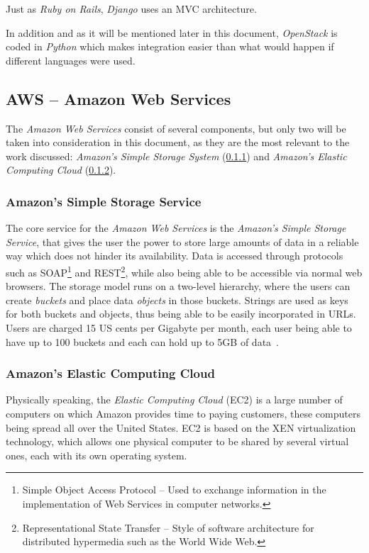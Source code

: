 Just as \textit{Ruby on Rails}, \textit{Django} uses an MVC architecture.

In addition and as it will be mentioned later in this document, \textit{OpenStack} is coded in \textit{Python} which makes integration easier than what would happen if different languages were used.

\subsection{AWS -- Amazon Web Services}\label{aws}

The \textit{Amazon Web Services} consist of several components, but only two will be taken into consideration in this document, as they are the most relevant to the work discussed: \textit{Amazon's Simple Storage System} (\ref{amazon-sss}) and \textit{Amazon's Elastic Computing Cloud} (\ref{amazon-ec}).

\subsubsection{Amazon's Simple Storage Service}\label{amazon-sss}

The core service for the \textit{Amazon Web Services} is the \textit{Amazon's Simple Storage Service}, that gives the user the power to store large amounts of data in a reliable way which does not hinder its availability. Data is accessed through protocols such as SOAP\footnote{Simple Object Access Protocol -- Used to exchange information in the implementation of Web Services in computer networks.} and REST\footnote{Representational State Transfer -- Style of software architecture for distributed hypermedia such as the World Wide Web.}, while also being able to be accessible via normal web browsers.
The storage model runs on a two-level hierarchy, where the users can create \textit{buckets} and place data \textit{objects} in those buckets. Strings are used as keys for both buckets and objects, thus being able to be easily incorporated in URLs. Users are charged 15 US cents per Gigabyte per month, each user being able to have up to 100 buckets and each can hold up to 5GB of data~\cite{hazel}.

\subsubsection{Amazon's Elastic Computing Cloud}\label{amazon-ec}

Physically speaking, the \textit{Elastic Computing Cloud} (EC2) is a large number of computers on which Amazon provides time to paying customers, these computers being spread all over the United States. EC2 is based on the XEN virtualization technology, which allows one physical computer to be shared by several virtual ones, each with its own operating system.


